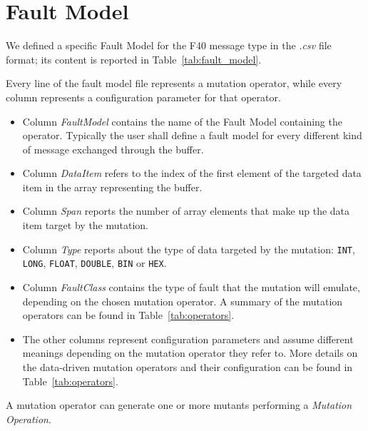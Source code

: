 \section{Fault Model}
We defined a specific Fault Model for the F40 message type in the \emph{.csv} file format; its content is reported in Table~\ref{tab:fault_model}.




Every line of the fault model file represents a mutation operator, while every column represents a configuration parameter for that operator.

\begin{itemize}
  \item Column \emph{FaultModel} contains the name of the Fault Model containing the operator. Typically the user shall define a fault model for every different kind of message exchanged through the buffer.

  \item Column \emph{DataItem} refers to the index of the first element of the targeted data item in the array representing the buffer.

  \item Column \emph{Span} reports the number of array elements that make up the data item target by the mutation.

  \item Column \emph{Type} reports about the type of data targeted by the mutation: \texttt{INT}, \texttt{LONG}, \texttt{FLOAT}, \texttt{DOUBLE}, \texttt{BIN} or \texttt{HEX}.

  \item Column \emph{FaultClass} contains the type of fault that the mutation will emulate, depending on the chosen mutation operator. A summary of the mutation operators can be found in Table~\ref{tab:operators}.

  \item The other columns represent configuration parameters and assume different meanings depending on the mutation operator they refer to. More details on the data-driven mutation operators and their configuration can be found in Table~\ref{tab:operators}.

\end{itemize}



A mutation operator can generate one or more mutants performing a \emph{Mutation Operation}.
